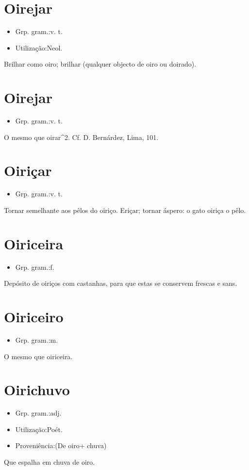 \section{Oirejar}
\begin{itemize}
\item {Grp. gram.:v. t.}
\end{itemize}
\begin{itemize}
\item {Utilização:Neol.}
\end{itemize}
Brilhar como oiro; brilhar (qualquer objecto de oiro ou doirado).
\section{Oirejar}
\begin{itemize}
\item {Grp. gram.:v. t.}
\end{itemize}
O mesmo que \textunderscore oirar\textunderscore ^2. Cf. D. Bernárdez, \textunderscore Lima\textunderscore , 101.
\section{Oiriçar}
\begin{itemize}
\item {Grp. gram.:v. t.}
\end{itemize}
Tornar semelhante aos pêlos do oiriço.
Eriçar; tornar áspero: \textunderscore o gato oiriça o pêlo\textunderscore .
\section{Oiriceira}
\begin{itemize}
\item {Grp. gram.:f.}
\end{itemize}
Depósito de oiriços com castanhas, para que estas se conservem frescas e sans.
\section{Oiriceiro}
\begin{itemize}
\item {Grp. gram.:m.}
\end{itemize}
O mesmo que \textunderscore oiriceira\textunderscore .
\section{Oirichuvo}
\begin{itemize}
\item {Grp. gram.:adj.}
\end{itemize}
\begin{itemize}
\item {Utilização:Poét.}
\end{itemize}
\begin{itemize}
\item {Proveniência:(De \textunderscore oiro\textunderscore  + \textunderscore chuva\textunderscore )}
\end{itemize}
Que espalha em chuva de oiro.
